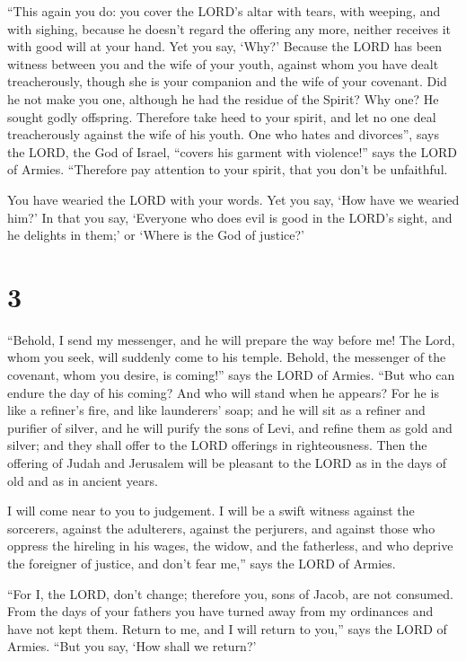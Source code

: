  ``This again you do: you cover the LORD's altar with
tears, with weeping, and with sighing, because he doesn't regard the
offering any more, neither receives it with good will at your hand.
 Yet you say, `Why?' Because the LORD has been witness
between you and the wife of your youth, against whom you have dealt
treacherously, though she is your companion and the wife of your
covenant.  Did he not make you one, although he had the
residue of the Spirit? Why one? He sought godly offspring. Therefore
take heed to your spirit, and let no one deal treacherously against the
wife of his youth.  One who hates and divorces'', says the
LORD, the God of Israel, ``covers his garment with violence!'' says the
LORD of Armies. ``Therefore pay attention to your spirit, that you don't
be unfaithful.

 You have wearied the LORD with your words. Yet you say,
`How have we wearied him?' In that you say, `Everyone who does evil is
good in the LORD's sight, and he delights in them;' or `Where is the God
of justice?'

\hypertarget{section-2}{%
\section{3}\label{section-2}}

 ``Behold, I send my messenger, and he will prepare the way
before me! The Lord, whom you seek, will suddenly come to his temple.
Behold, the messenger of the covenant, whom you desire, is coming!''
says the LORD of Armies.  ``But who can endure the day of
his coming? And who will stand when he appears? For he is like a
refiner's fire, and like launderers' soap;  and he will sit
as a refiner and purifier of silver, and he will purify the sons of
Levi, and refine them as gold and silver; and they shall offer to the
LORD offerings in righteousness.  Then the offering of Judah
and Jerusalem will be pleasant to the LORD as in the days of old and as
in ancient years.

 I will come near to you to judgement. I will be a swift
witness against the sorcerers, against the adulterers, against the
perjurers, and against those who oppress the hireling in his wages, the
widow, and the fatherless, and who deprive the foreigner of justice, and
don't fear me,'' says the LORD of Armies.

 ``For I, the LORD, don't change; therefore you, sons of
Jacob, are not consumed.  From the days of your fathers you
have turned away from my ordinances and have not kept them. Return to
me, and I will return to you,'' says the LORD of Armies. ``But you say,
`How shall we return?'

